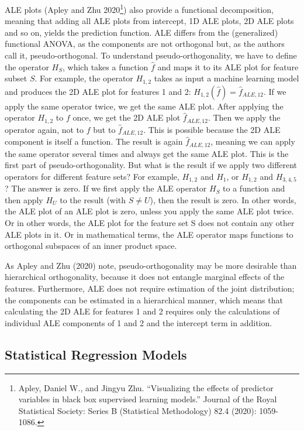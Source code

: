 \documentclass[
  11pt,
]{scrbook}
\begin{document}
ALE plots (Apley and Zhu 2020\footnote{Apley, Daniel W., and Jingyu Zhu. ``Visualizing the effects of predictor variables in black box supervised learning models.'' Journal of the Royal Statistical Society: Series B (Statistical Methodology) 82.4 (2020): 1059-1086.}) also provide a functional decomposition, meaning that adding all ALE plots from intercept, 1D ALE plots, 2D ALE plots and so on, yields the prediction function.
ALE differs from the (generalized) functional ANOVA, as the components are not orthogonal but, as the authors call it, pseudo-orthogonal.
To understand pseudo-orthogonality, we have to define the operator \(H_S\), which takes a function \(\hat{f}\) and maps it to its ALE plot for feature subset \(S\).
For example, the operator \(H_{1,2}\) takes as input a machine learning model and produces the 2D ALE plot for features 1 and 2: \(H_{1,2}(\hat{f}) = \hat{f}_{ALE,12}\).
If we apply the same operator twice, we get the same ALE plot.
After applying the operator \(H_{1,2}\) to \(f\) once, we get the 2D ALE plot \(\hat{f}_{ALE,12}\).
Then we apply the operator again, not to \(f\) but to \(\hat{f}_{ALE,12}\).
This is possible because the 2D ALE component is itself a function.
The result is again \(\hat{f}_{ALE,12}\), meaning we can apply the same operator several times and always get the same ALE plot.
This is the first part of pseudo-orthogonality.
But what is the result if we apply two different operators for different feature sets?
For example, \(H_{1,2}\) and \(H_{1}\), or \(H_{1,2}\) and \(H_{3,4,5}\)?
The answer is zero.
If we first apply the ALE operator \(H_S\) to a function and then apply \(H_U\) to the result (with \(S \neq U\)), then the result is zero.
In other words, the ALE plot of an ALE plot is zero, unless you apply the same ALE plot twice.
Or in other words, the ALE plot for the feature set S does not contain any other ALE plots in it.
Or in mathematical terms, the ALE operator maps functions to orthogonal subspaces of an inner product space.

As Apley and Zhu (2020) note, pseudo-orthogonality may be more desirable than hierarchical orthogonality, because it does not entangle marginal effects of the features.
Furthermore, ALE does not require estimation of the joint distribution; the components can be estimated in a hierarchical manner, which means that calculating the 2D ALE for features 1 and 2 requires only the calculations of individual ALE components of 1 and 2 and the intercept term in addition.

\hypertarget{statistical-regression-models}{%
\subsection{Statistical Regression Models}\label{statistical-regression-models}}
\end{document}

